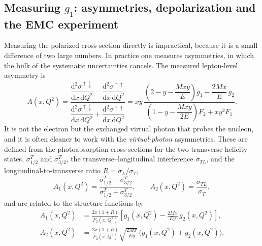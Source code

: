 \FloatBarrier

\subsection{Measuring \texorpdfstring{$g_{1}$}{g1}: asymmetries, depolarization and
the EMC experiment}
\label{subsec:g1-measurement}

Measuring the polarized cross section directly is impractical, because it is a small
difference of two large numbers. In practice one measures asymmetries, in which the bulk
of the systematic uncertainties cancels. The measured lepton-level asymmetry is
\begin{equation}
    A(x,Q^{2})
    = \frac{\dfrac{\mathrm{d}^{2}\sigma^{\uparrow\downarrow}}{\mathrm{d}x\,\mathrm{d}Q^{2}}
          - \dfrac{\mathrm{d}^{2}\sigma^{\uparrow\uparrow}}{\mathrm{d}x\,\mathrm{d}Q^{2}}}
           {\dfrac{\mathrm{d}^{2}\sigma^{\uparrow\downarrow}}{\mathrm{d}x\,\mathrm{d}Q^{2}}
          + \dfrac{\mathrm{d}^{2}\sigma^{\uparrow\uparrow}}{\mathrm{d}x\,\mathrm{d}Q^{2}}}
    = x y\,
      \frac{\left(2 - y - \dfrac{Mxy}{E}\right)g_{1} - \dfrac{2Mx}{E}\,g_{2}}
           {\left(1 - y - \dfrac{Mxy}{2E}\right)F_{2} + x y^{2}F_{1}}.
    \label{eq:A-lepton}
\end{equation}
It is not the electron but the exchanged virtual photon that probes the nucleon, and it
is often cleaner to work with the \emph{virtual-photon} asymmetries. These are defined
from the photoabsorption cross sections for the two transverse helicity states,
$\sigma^{T}_{1/2}$ and $\sigma^{T}_{3/2}$, the transverse--longitudinal interference
$\sigma_{TL}$, and the longitudinal-to-transverse ratio $R=\sigma_{L}/\sigma_{T}$,
\begin{equation}
    A_{1}(x,Q^{2}) = \frac{\sigma^{T}_{1/2} - \sigma^{T}_{3/2}}
                          {\sigma^{T}_{1/2} + \sigma^{T}_{3/2}},
    \qquad
    A_{2}(x,Q^{2}) = \frac{\sigma_{TL}}{\sigma_{T}},
    \label{eq:A1A2-def}
\end{equation}
and are related to the structure functions by
\begin{align}
    A_{1}(x,Q^{2}) &= \frac{2x(1+R)}{F_{2}(x,Q^{2})}
        \left[g_{1}(x,Q^{2}) - \frac{2Mx}{Ey}\,g_{2}(x,Q^{2})\right],
    \label{eq:A1}\\
    A_{2}(x,Q^{2}) &= \frac{2x(1+R)}{F_{2}(x,Q^{2})}
        \sqrt{\frac{2Mx}{Ey}}\,
        \bigl(g_{1}(x,Q^{2}) + g_{2}(x,Q^{2})\bigr).
    \label{eq:A2}
\end{align}
